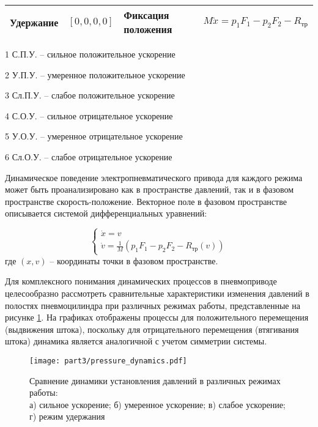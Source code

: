 \begin{table}[htbp]
\begin{tabular}{lcll}
		\hline
		Удержание                  & $[0,0,0,0]$         &
		Фиксация положения         &
		$M\ddot{x} = p_1F_1 - p_2F_2 - R_\text{тр}$                                              \\
		\midrule
	\end{tabular}
	\begin{tablenotes}
		\scriptsize
		\item[1] С.П.У. -- сильное положительное ускорение
		\item[2] У.П.У. -- умеренное положительное ускорение
		\item[3] Сл.П.У. -- слабое положительное ускорение
		\item[4] С.О.У. -- сильное отрицательное ускорение
		\item[5] У.О.У. -- умеренное отрицательное ускорение
		\item[6] Сл.О.У. -- слабое отрицательное ускорение
	\end{tablenotes}
\end{table}

Динамическое поведение электропневматического привода для каждого режима может быть
проанализировано как в пространстве давлений, так и в фазовом пространстве
скорость-положение. Векторное поле в фазовом пространстве описывается системой дифференциальных уравнений:

\begin{equation*}
	\begin{cases}
		\dot{x} = v \\
		\dot{v} = \frac{1}{M}(p_1F_1 - p_2F_2 - R_\text{тр}(v))
	\end{cases}
\end{equation*}
где $(x,v)$ -- координаты точки в фазовом пространстве.

Для комплексного понимания динамических процессов в пневмоприводе целесообразно рассмотреть
сравнительные характеристики изменения давлений в полостях пневмоцилиндра
при различных режимах работы, представленные на рисунке \ref{fig:pressure_comparison}.
На графиках отображены процессы для положительного перемещения (выдвижения штока),
поскольку для отрицательного перемещения (втягивания штока) динамика является аналогичной с учетом симметрии системы.

\begin{figure}[htbp]
	\centering
	\texttt{[image: part3/pressure\_dynamics.pdf]}
	\caption{Сравнение динамики установления давлений в различных режимах работы:\\
		а) сильное ускорение; б) умеренное ускорение; в) слабое ускорение; г) режим удержания}
	\label{fig:pressure_comparison}
\end{figure}


